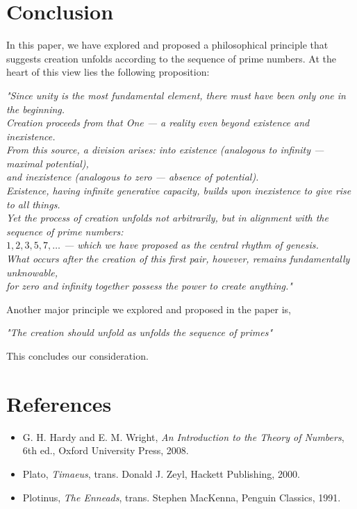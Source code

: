 \section{Conclusion}

In this paper, we have explored and proposed a philosophical principle that suggests creation unfolds according to the sequence of prime numbers. At the heart of this view lies the following proposition:

\begin{center}
\emph{
"Since unity is the most fundamental element, there must have been only one in the beginning.\\
Creation proceeds from that One — a reality even beyond existence and inexistence.\\
From this source, a division arises: into existence (analogous to infinity — maximal potential),\\
and inexistence (analogous to zero — absence of potential).\\
Existence, having infinite generative capacity, builds upon inexistence to give rise to all things.\\
Yet the process of creation unfolds not arbitrarily, but in alignment with the sequence of prime numbers:\\
$1, 2, 3, 5, 7, \dots$ — which we have proposed as the central rhythm of genesis.\\
What occurs after the creation of this first pair, however, remains fundamentally unknowable,\\
for zero and infinity together possess the power to create anything."
}
\end{center}

Another major principle we explored and proposed in the paper is,

\begin{center}
\emph{"The creation should unfold as unfolds the sequence of primes"}
\end{center}

This concludes our consideration.

\section*{References}
\begin{itemize}
  \item G. H. Hardy and E. M. Wright, \textit{An Introduction to the Theory of Numbers}, 6th ed., Oxford University Press, 2008.
  \item Plato, \textit{Timaeus}, trans. Donald J. Zeyl, Hackett Publishing, 2000.
  \item Plotinus, \textit{The Enneads}, trans. Stephen MacKenna, Penguin Classics, 1991.
\end{itemize}


